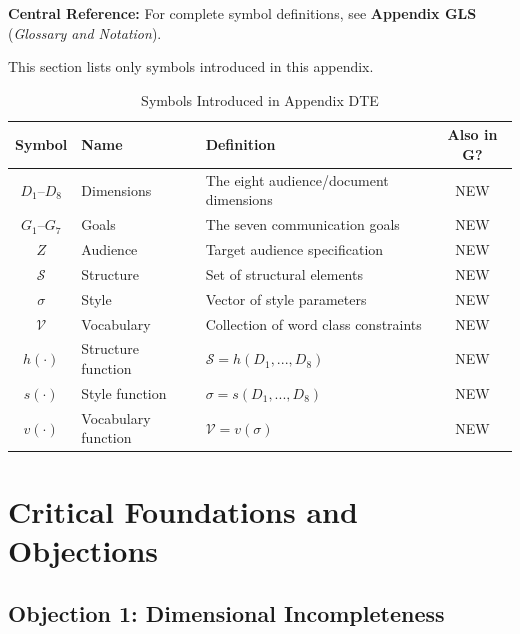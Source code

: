 \begin{tcolorbox}[colback=blue!5!white, colframe=blue!75!black]
\textbf{Central Reference:} For complete symbol definitions, see
\textbf{Appendix GLS} (\textit{Glossary and Notation}).

This section lists only symbols introduced in this appendix.
\end{tcolorbox}

\vspace{0.5em}

\begin{table}[htbp]
\centering
\caption{Symbols Introduced in Appendix DTE}
\label{tab:doctype-theory-symbols}
\renewcommand{\arraystretch}{1.3}
\begin{tabular}{@{}clp{6cm}c@{}}
\toprule
\textbf{Symbol} & \textbf{Name} & \textbf{Definition} & \textbf{Also in G?} \\
\midrule
$D_1$--$D_8$ & Dimensions & The eight audience/document dimensions & NEW \\
$G_1$--$G_7$ & Goals & The seven communication goals & NEW \\
$Z$ & Audience & Target audience specification & NEW \\
$\mathcal{S}$ & Structure & Set of structural elements & NEW \\
$\sigma$ & Style & Vector of style parameters & NEW \\
$\mathcal{V}$ & Vocabulary & Collection of word class constraints & NEW \\
$h(\cdot)$ & Structure function & $\mathcal{S} = h(D_1,...,D_8)$ & NEW \\
$s(\cdot)$ & Style function & $\sigma = s(D_1,...,D_8)$ & NEW \\
$v(\cdot)$ & Vocabulary function & $\mathcal{V} = v(\sigma)$ & NEW \\
\bottomrule
\end{tabular}
\end{table}


\section{Critical Foundations and Objections}
\label{sec:doctype-theory-critical}

\subsection{Objection 1: Dimensional Incompleteness}

